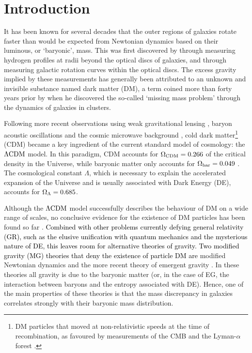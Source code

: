 \documentclass[usenatbib]{mnras}
\newcommand{\lcdm}{{\rm \Lambda CDM}}
\newcommand{\un}[1]{_{\rm #1}}
\begin{document}
\clearpage




\section{Introduction}
\label{sec:introduction}

It has been known for several decades that the outer regions of galaxies rotate faster than would be expected from Newtonian dynamics based on their luminous, or `baryonic', mass. This was first discovered by \cite{bosma1981} through measuring hydrogen profiles at radii beyond the optical discs of galaxies, and \cite{rubin1983} through measuring galactic rotation curves within the optical discs. The excess gravity implied by these measurements has generally been attributed to an unknown and invisible substance named dark matter (DM), a term coined more than forty years prior by \cite{zwicky1937} when he discovered the so-called `missing mass problem' through the dynamics of galaxies in clusters.

Following more recent observations using weak gravitational lensing \cite[WL,][]{hoekstra2004,linden2014,mandelbaum2015}, baryon acoustic oscillations \cite[BAO,][]{eisenstein2005,blake2011} and the cosmic microwave background \cite[CMB,][]{spergel2003,planck2014}, cold dark matter\footnote{DM particles that moved at non-relativistic speeds at the time of recombination, as favoured by measurements of the CMB \cite[]{planck2014} and the Lyman-$\alpha$ forest \cite[]{viel2013}.} (CDM) became a key ingredient of the current standard model of cosmology: the $\lcdm$ model. In this paradigm, CDM accounts for $\Omega\un{CDM}=0.266$ of the critical density in the Universe, while baryonic matter only accounts for $\Omega\un{bar}=0.049$ \cite[]{planck2018}. The cosmological constant $\Lambda$, which is necessary to explain the accelerated expansion of the Universe and is usually associated with Dark Energy (DE), accounts for $\Omega\un{\Lambda}=0.685$.

Although the $\lcdm$ model successfully describes the behaviour of DM on a wide range of scales, no conclusive evidence for the existence of DM particles has been found so far \cite[despite years of enormous effort; for an overview, see][]{bertone2005,bertone2018}. \textcolor{black}{Combined with other problems currently defying general relativity (GR), such as the elusive unification with quantum mechanics and the mysterious nature of DE, this leaves room for alternative theories of gravity. Two modified gravity (MG) theories that deny the existence of particle DM are} modified Newtonian dynamics \cite[MOND,][]{milgrom1983} and the more recent theory of emergent gravity \cite[EG,][]{verlinde2016}. In these theories all gravity is due to the baryonic matter (or, in the case of EG, the interaction between baryons and the entropy associated with DE). Hence, one of the main properties of these theories is that the mass discrepancy in galaxies correlates strongly with their baryonic mass distribution.
\end{document}
